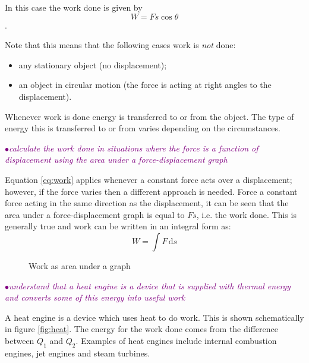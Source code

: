 \documentclass[a4paper,11pt,twoside]{memoir}
\newcommand{\ud}{\,\mathrm{d}}
\newcounter{spec}[chapter]
\newcommand{\spec}[1]{\Needspace{5\baselineskip}\textcolor{purple}{$\bullet$\hspace{0.5cm}\textit{#1}}}
\begin{document}
In this case the work done is given by
 \begin{equation}\label{eq:work}
 W = Fs\cos{\theta}
 \end{equation}.

Note that this means that the following cases work is \emph{not} done:
\begin{itemize}
  \item any stationary object (no displacement);
  \item an object in circular motion (the force is acting at right angles to the displacement).
\end{itemize}

Whenever work is done energy is transferred to or from the object. The type of energy this is transferred to or from varies depending on the circumstances.

\spec{calculate the work done in situations where the force is a function of displacement using the area under a force-displacement graph}

Equation \ref{eq:work} applies whenever a constant force acts over a displacement; however, if the force varies then a different approach is needed. Force a constant force acting in the same direction as the displacement, it can be seen that the area under a force-displacement graph is equal to $Fs$, i.e. the work done. This is generally true and work can be written in an integral form as:
\begin{equation}\label{eq:work-integral}
  W = \int F \ud s
\end{equation}

\begin{figure}[h]
  \begin{center}
  \end{center}
  \caption{Work as area under a graph}
  \label{fig:work-graph}
\end{figure}

\spec{understand that a heat engine is a device that is supplied with thermal energy and converts some of this energy into useful work}

A heat engine is a device which uses heat to do work. This is shown schematically in figure \ref{fig:heat}. The energy for the work done comes from the difference between $Q_1$ and $Q_2$.
Examples of heat engines include internal combustion engines, jet engines and steam turbines.
\end{document}
